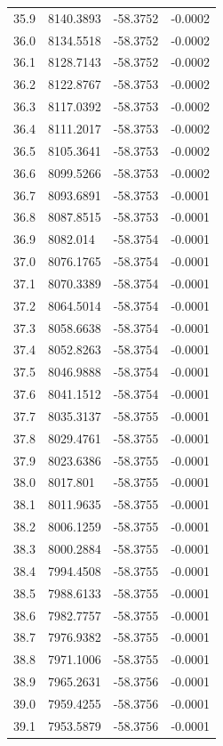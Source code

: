 \begin{table}[H]
\begin{tabular}{llll}
35.9 & 8140.3893 & -58.3752 & -0.0002 \\
36.0 & 8134.5518 & -58.3752 & -0.0002 \\
36.1 & 8128.7143 & -58.3752 & -0.0002 \\
36.2 & 8122.8767 & -58.3753 & -0.0002 \\
36.3 & 8117.0392 & -58.3753 & -0.0002 \\
36.4 & 8111.2017 & -58.3753 & -0.0002 \\
36.5 & 8105.3641 & -58.3753 & -0.0002 \\
36.6 & 8099.5266 & -58.3753 & -0.0002 \\
36.7 & 8093.6891 & -58.3753 & -0.0001 \\
36.8 & 8087.8515 & -58.3753 & -0.0001 \\
36.9 & 8082.014 & -58.3754 & -0.0001 \\
37.0 & 8076.1765 & -58.3754 & -0.0001 \\
37.1 & 8070.3389 & -58.3754 & -0.0001 \\
37.2 & 8064.5014 & -58.3754 & -0.0001 \\
37.3 & 8058.6638 & -58.3754 & -0.0001 \\
37.4 & 8052.8263 & -58.3754 & -0.0001 \\
37.5 & 8046.9888 & -58.3754 & -0.0001 \\
37.6 & 8041.1512 & -58.3754 & -0.0001 \\
37.7 & 8035.3137 & -58.3755 & -0.0001 \\
37.8 & 8029.4761 & -58.3755 & -0.0001 \\
37.9 & 8023.6386 & -58.3755 & -0.0001 \\
38.0 & 8017.801 & -58.3755 & -0.0001 \\
38.1 & 8011.9635 & -58.3755 & -0.0001 \\
38.2 & 8006.1259 & -58.3755 & -0.0001 \\
38.3 & 8000.2884 & -58.3755 & -0.0001 \\
38.4 & 7994.4508 & -58.3755 & -0.0001 \\
38.5 & 7988.6133 & -58.3755 & -0.0001 \\
38.6 & 7982.7757 & -58.3755 & -0.0001 \\
38.7 & 7976.9382 & -58.3755 & -0.0001 \\
38.8 & 7971.1006 & -58.3755 & -0.0001 \\
38.9 & 7965.2631 & -58.3756 & -0.0001 \\
39.0 & 7959.4255 & -58.3756 & -0.0001 \\
39.1 & 7953.5879 & -58.3756 & -0.0001 \\

\end{tabular}
\end{table}
